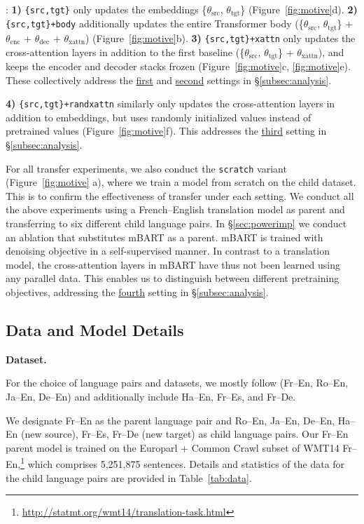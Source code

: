 :
\textbf{1)} \texttt{\{src,tgt\}} only updates the embeddings \{$\theta_{\text{src}}$, $\theta_{\text{tgt}}$\} (Figure~\ref{fig:motive}d).
\textbf{2)} \texttt{\{src,tgt\}+body} additionally updates the entire Transformer body (\{$\theta_{\text{src}}$,  $\theta_{\text{tgt}}$\} + $\theta_{\text{enc}}$ + $\theta_{\text{dec}}$ + $\theta_{\text{xattn}}$) (Figure~\ref{fig:motive}b).
\textbf{3)} \texttt{\{src,tgt\}+xattn} only updates the cross-attention layers in addition to the first baseline (\{$\theta_{\text{src}}$, $\theta_{\text{tgt}}$\} + $\theta_{\text{xattn}}$), and keeps the encoder and decoder stacks frozen (Figure~\ref{fig:motive}c, \ref{fig:motive}e). These collectively address the \hyperref[a:s1]{first} and \hyperref[a:s2]{second} settings in \S\ref{subsec:analysis}.

\textbf{4)} \texttt{\{src,tgt\}+randxattn} similarly only updates the cross-attention layers in addition to embeddings, but uses randomly initialized values instead of pretrained values (Figure~\ref{fig:motive}f). This addresses the \hyperref[a:s3]{third} setting in \S\ref{subsec:analysis}.

For all transfer experiments, we also conduct the \texttt{scratch} variant (Figure~\ref{fig:motive} a), where we train a model from scratch on the child dataset. This is to confirm the effectiveness of transfer under each setting. We conduct all the above experiments using a French--English translation model as parent and transferring to six different child language pairs. In \S\ref{sec:powerimp} we conduct an ablation that substitutes mBART \cite{liu-etal-2020-multilingual} as a parent. mBART is trained with denoising objective in a self-supervised manner. In contrast to a translation model, the cross-attention layers in mBART have thus not been learned using any parallel data. This enables us to distinguish between different pretraining objectives, addressing the \hyperref[a:s4]{fourth} setting in \S\ref{subsec:analysis}.

\subsection{Data and Model Details}

\textbf{Dataset.}

For the choice of language pairs and datasets, we mostly follow  (Fr--En, Ro--En, Ja--En, De--En) and additionally include Ha--En, Fr--Es, and Fr--De.

We designate Fr--En as the parent language pair and Ro--En, Ja--En, De--En, Ha--En (new source), Fr--Es, Fr--De (new target) as child language pairs. Our Fr--En parent model is trained on the Europarl + Common Crawl subset of WMT14 Fr--En,\footnote{\url{http://statmt.org/wmt14/translation-task.html}} which comprises 5,251,875 sentences. Details and statistics of the data for the child language pairs are provided in Table~\ref{tab:data}.

